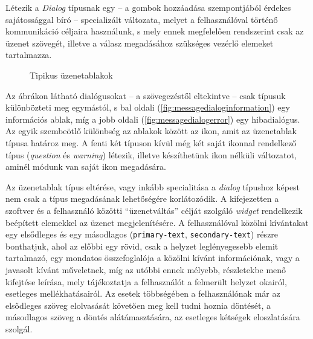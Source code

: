 Létezik a \textit{Dialog} típusnak egy -- a gombok hozzáadása szempontjából érdekes sajátossággal bíró -- specializált változata, melyet a felhasználóval történő kommunikáció céljaira használunk, s mely ennek megfelelően rendszerint csak az üzenet szövegét, illetve a válasz megadásához szükséges vezérlő elemeket tartalmazza.

\begin{figure}[H]
\begin{center}
\hspace{12pt}
\caption{Tipikus üzenetablakok}
\end{center}
\end{figure}

Az ábrákon látható dialógusokat -- a szövegezéstől eltekintve -- csak típusuk különbözteti meg egymástól, s bal oldali (\ref{fig:messagedialoginformation}) egy információs ablak, míg a jobb oldali (\ref{fig:messagedialogerror}) egy hibadialógus. Az egyik szembeötlő különbség az ablakok között az ikon, amit az üzenetablak típusa határoz meg. A fenti két típuson kívül még két saját ikonnal rendelkező típus (\textit{question} és \textit{warning}) létezik, illetve készíthetünk ikon nélküli változatot, aminél módunk van saját ikon megadására.

Az üzenetablak típus eltérése, vagy inkább specialitása a \textit{dialog} típushoz képest nem csak a típus megadásának lehetőségére korlátozódik. A kifejezetten a szoftver és a felhasználó közötti ``üzenetváltás'' célját szolgáló \textit{widget} rendelkezik beépített elemekkel az üzenet megjelenítésére. A felhasználóval közölni kívántakat egy elsődleges és egy másodlagos (\texttt{primary-text}, \texttt{secondary-text}) részre bonthatjuk, ahol az előbbi egy rövid, csak a helyzet leglényegesebb elemit tartalmazó, egy mondatos összefoglalója a közölni kívánt információnak, vagy a javasolt kívánt műveletnek, míg az utóbbi ennek mélyebb, részletekbe menő kifejtése leírása, mely tájékoztatja a felhasználót a felmerült helyzet okairól, esetleges mellékhatásairól. Az esetek többségében a felhasználónak már az elsődleges szöveg elolvasását követően meg kell tudni hoznia döntését, a másodlagos szöveg a döntés alátámasztására, az esetleges kétségek eloszlatására szolgál.

